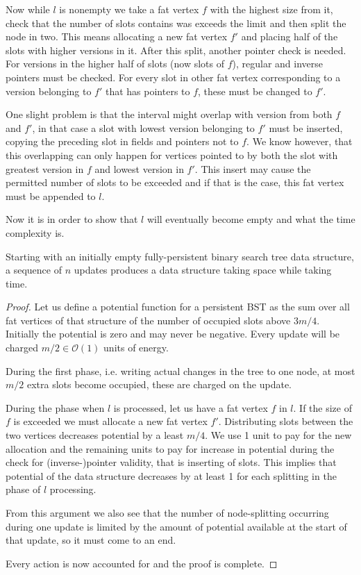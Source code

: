 Now while $l$ is nonempty we take a fat vertex $f$ with the highest size from it, check that the number of slots contains was exceeds the limit and then split the node in two. This means allocating a new fat vertex $f'$ and placing half of the slots with higher versions in it. After this split, another pointer check is needed. For versions in the higher half of slots (now slots of $f$), regular and inverse pointers must be checked. For every slot in other fat vertex corresponding to a version belonging to $f'$  that has pointers to $f$, these must be changed to $f'$. 

One slight problem is that the interval might overlap with version from both $f$ and $f'$, in that case a slot with lowest version belonging to $f'$ must be inserted, copying the preceding slot in fields and pointers not to $f$. We know however, that this overlapping can only happen for vertices pointed to by both the slot with greatest version in $f$ and lowest version in $f'$. This insert may cause the permitted number of slots to be exceeded and if that is the case, this fat vertex must be appended to $l$.

Now it is in order to show that $l$ will eventually become empty and what the time complexity is.

\begin{prop}
Starting with an initially empty fully-persistent binary search tree data structure, a sequence of $n$ updates produces a data structure taking  space while taking  time.
\end{prop}

\begin{proof}
Let us define a potential function for a persistent BST as the sum over all fat vertices of that structure of the number of occupied slots above $3m/4$. Initially the potential is zero and may never be negative. Every update will be charged $m/2 \in \mathcal{O}(1)$ units of energy.

During the first phase, i.e. writing actual changes in the tree to one node, at most $m/2$ extra slots become occupied, these are charged on the update.

During the phase when $l$ is processed, let us have a fat vertex $f$ in $l$. If the size of $f$ is exceeded we must allocate a new fat vertex $f'$. Distributing slots between the two vertices decreases potential by a least $m/4$. We use 1 unit to pay for the new allocation and the remaining units to pay for increase in potential during the check for (inverse-)pointer validity, that is inserting of slots. This implies that potential of the data structure decreases by at least 1 for each splitting in the phase of $l$ processing.

From this argument we also see that the number of node-splitting occurring during one update is limited by the amount of potential available at the start of that update, so it must come to an end.

Every action is now accounted for and the proof is complete.
\end{proof}

